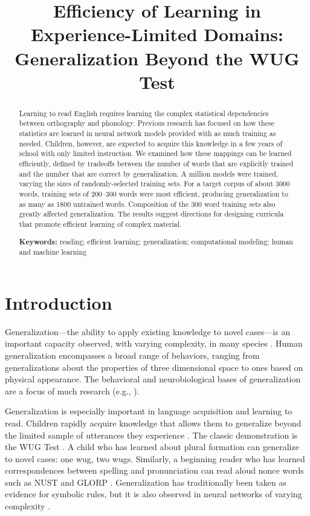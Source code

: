 \documentclass[10pt,letterpaper]{article}
\title{Efficiency of Learning in Experience-Limited Domains:\\Generalization Beyond the WUG Test}
\author{%
	{\large \bf Christopher R.~Cox (chriscox@lsu.edu)} \\
	Department of Psychology, Louisiana State University \\
	1005 Field House Dr, Baton Rouge, LA 70802 USA
	\AND%
	{\large \bf Matthew Cooper~Borkenhagen \and Mark S.~Seidenberg} \\
	Department of Psychology, University of Wisconsin-Madison\\
	1202 W. Johnson Street, Madison, WI 53706 USA
}
\newcommand{\exword}[1]{\MakeUppercase{#1}}
\begin{document}
\maketitle


\begin{abstract}
Learning to read English requires learning the complex statistical dependencies between orthography and phonology. Previous research has focused on how these statistics are learned in neural network models provided with as much training as needed. Children, however, are expected to acquire this knowledge in a few years of school with only limited instruction. We examined how these mappings can be learned efficiently, defined by tradeoffs between the number of words that are explicitly trained and the number that are correct by generalization. A million models were trained, varying the sizes of randomly-selected training sets. For a target corpus of about 3000 words, training sets of 200--300 words were most efficient, producing generalization to as many as 1800 untrained words. Composition of the 300 word training sets also greatly affected generalization. The results suggest directions for designing curricula that promote efficient learning of complex material. 

\textbf{Keywords:} 
reading; efficient learning; generalization; computational modeling; human and machine learning
\end{abstract}


\section{Introduction}

Generalization---the ability to apply existing knowledge to novel cases---is an important capacity observed, with varying complexity, in many species \cite{Santolin2018}. Human generalization encompasses a broad range of behaviors, ranging from generalizations about the properties of three dimensional space to ones based on physical appearance.  The behavioral and neurobiological bases of generalization are a focus of much research (e.g., ).

Generalization is especially important in language acquisition and learning to read. Children rapidly acquire knowledge that allows them to generalize beyond the limited sample of utterances they experience \cite{Chomsky1965}. The classic demonstration is the WUG Test \cite{Berko1958}. A child who has learned about plural formation can generalize to novel cases: one wug, two wugs. Similarly, a beginning reader who has learned correspondences between spelling and pronunciation can read aloud nonce words such as \exword{nust} and \exword{glorp} \cite{Seidenberg1989}.  Generalization has traditionally been taken as evidence for symbolic rules, but it is also observed in neural networks of varying complexity \cite{Seidenberg2014,LeCun2015}.  
\end{document}
